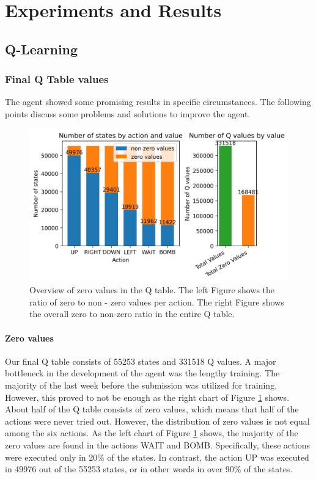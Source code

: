 \documentclass[
	letterpaper, %
	12pt, %
]{CSUniSchoolLabReport}
\begin{document}
\section{Experiments and Results}

\subsection{Q-Learning}
\subsubsection{Final Q Table values \AB}
The agent showed some promising results in specific circumstances. The following points discuss
some problems and solutions to improve the agent.


\begin{figure}[H]
	\includegraphics[width =\textwidth]{Figures/zeros.png}
	\caption{Overview of zero values in the Q table. The left Figure shows the ratio of zero to non - zero
		values per action. The right Figure shows the overall zero to non-zero ratio in the entire
		Q table.}
	\label{img:zero-values}
\end{figure}

\paragraph*{Zero values}
Our final Q table consists of 55253 states and 331518 Q values. %
A major bottleneck in the development of the agent was the lengthy training.
The majority of the last week before the submission was utilized for training.
However, this proved to not be enough as the
right chart of Figure \ref{img:zero-values} shows. About half of the Q table consists of zero
values, which means that half of the actions were never tried out.
However, the distribution of zero values is not equal among the six actions. As the left chart of Figure
\ref{img:zero-values} shows, the majority of the zero values are found in the actions
WAIT and BOMB. Specifically, these actions were executed only in 20\% of the states.
In contrast, the action UP was executed in 49976 out of the 55253 states,
or in other words in over 90\% of the states.
\end{document}
